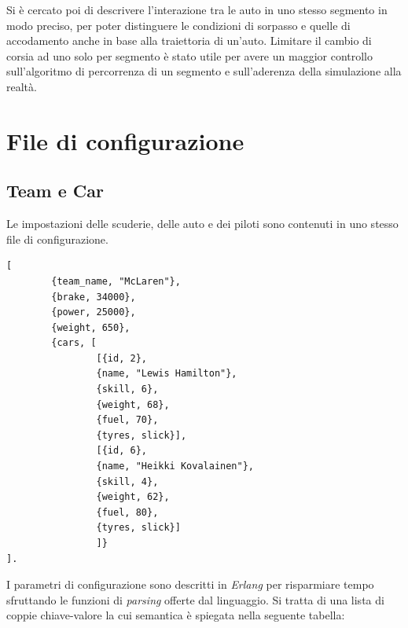 \documentclass[a4paper]{report}
\newcommand{\Erlang}{\textsl{Erlang}}
\begin{document}
Si è cercato poi di descrivere l'interazione tra le auto in uno stesso segmento in modo preciso, per poter distinguere le condizioni di sorpasso e quelle di accodamento anche in base alla traiettoria di un'auto. Limitare il cambio di corsia ad uno solo per segmento è stato utile per avere un maggior controllo sull'algoritmo di percorrenza di un segmento e sull'aderenza della simulazione alla realtà.


\appendix


\chapter{File di configurazione}
\section*{Team e Car}
Le impostazioni delle scuderie, delle auto e dei piloti sono contenuti in uno stesso file di configurazione.

\begin{lstlisting}
[
        {team_name, "McLaren"},
        {brake, 34000},
        {power, 25000},
        {weight, 650},
        {cars, [
                [{id, 2},
                {name, "Lewis Hamilton"},
                {skill, 6},
                {weight, 68},
                {fuel, 70},
                {tyres, slick}],
                [{id, 6},
                {name, "Heikki Kovalainen"},
                {skill, 4},
                {weight, 62},
                {fuel, 80},
                {tyres, slick}]
                ]}
].
\end{lstlisting}

I parametri di configurazione sono descritti in \Erlang{} per risparmiare tempo sfruttando le funzioni di \textit{parsing} offerte dal linguaggio. Si tratta di una lista di coppie chiave-valore la cui semantica è spiegata nella seguente tabella:
\end{document}
